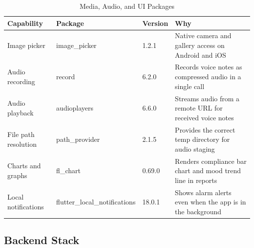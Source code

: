 \documentclass[12pt,a4paper]{report}
\begin{document}
\begin{table}[H]
\centering
\caption{Media, Audio, and UI Packages}
\label{tab:media_packages}
\begin{tabularx}{\textwidth}{@{}lXlX@{}}
\toprule
\textbf{Capability}      & \textbf{Package}              & \textbf{Version} & \textbf{Why} \\
\midrule
Image picker             & image\_picker                 & 1.2.1  & Native camera and gallery access on Android and iOS \\
Audio recording          & record                        & 6.2.0  & Records voice notes as compressed audio in a single call \\
Audio playback           & audioplayers                  & 6.6.0  & Streams audio from a remote URL for received voice notes \\
File path resolution     & path\_provider                & 2.1.5  & Provides the correct temp directory for audio staging \\
Charts and graphs        & fl\_chart                     & 0.69.0 & Renders compliance bar chart and mood trend line in reports \\
Local notifications      & flutter\_local\_notifications & 18.0.1 & Shows alarm alerts even when the app is in the background \\
\bottomrule
\end{tabularx}
\end{table}

\subsection{Backend Stack}
\end{document}
